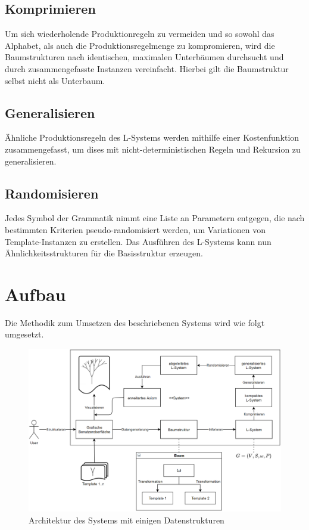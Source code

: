 \subsection*{Komprimieren}
Um sich wiederholende Produktionregeln zu vermeiden und so sowohl das Alphabet, als auch die Produktionsregelmenge
zu kompromieren, wird die Baumstrukturen nach identischen, maximalen Unterbäumen durchsucht und durch zusammengefasste
Instanzen vereinfacht.
Hierbei gilt die Baumstruktur selbst nicht als Unterbaum.

\subsection*{Generalisieren}
Ähnliche Produktionsregeln des L-Systems werden mithilfe einer Kostenfunktion zusammengefasst, um dises mit
nicht-deterministischen Regeln und Rekursion zu generalisieren.

\subsection*{Randomisieren}
Jedes Symbol der Grammatik nimmt eine Liste an Parametern entgegen, die nach bestimmten Kriterien pseudo-randomisiert
werden, um Variationen von Template-Instanzen zu erstellen.
Das Ausführen des L-Systems kann nun Ähnlichkeitsstrukturen für die Basisstruktur erzeugen.

\section{Aufbau}

Die Methodik zum Umsetzen des beschriebenen Systems wird wie folgt umgesetzt.

\begin{figure}[H]
    \centering
    \includegraphics[width=14cm]{../images/System.PNG}
    \caption[Systemarchitektur]{Architektur des Systems mit einigen Datenstrukturen}
\end{figure}

